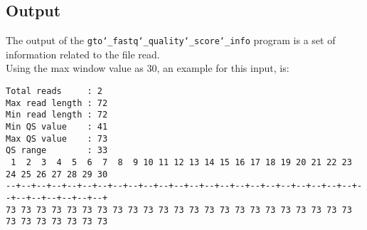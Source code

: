 \subsection*{Output}
The output of the \texttt{gto\char`_fastq\char`_quality\char`_score\char`_info} program is a set of information related to the file read. \\
Using the max window value as 30, an example for this input, is: 
\begin{lstlisting}
Total reads     : 2
Max read length : 72
Min read length : 72
Min QS value    : 41
Max QS value    : 73
QS range        : 33
 1  2  3  4  5  6  7  8  9 10 11 12 13 14 15 16 17 18 19 20 21 22 23 24 25 26 27 28 29 30 
--+--+--+--+--+--+--+--+--+--+--+--+--+--+--+--+--+--+--+--+--+--+--+--+--+--+--+--+--+--+
73 73 73 73 73 73 73 73 73 73 73 73 73 73 73 73 73 73 73 73 73 73 73 73 73 73 73 73 73 73 
\end{lstlisting}
